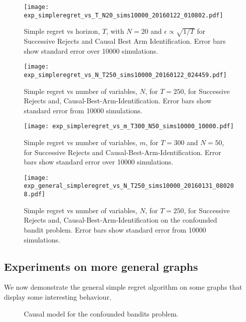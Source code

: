\begin{figure}
\caption{Simple regret vs horizon, $T$, with $N = 20$ and $\epsilon \propto \sqrt{1/T}$ for Successive Rejects and Causal Best Arm Identification. Error bars show standard error over 10000 simulations.}
\label{fig:simple_vs_T_vary_epsilon}
\centering
\texttt{[image: exp\_simpleregret\_vs\_T\_N20\_sims10000\_20160122\_010802.pdf]}
\end{figure}

\begin{figure}
\caption{Simple regret vs number of variables, $N$, for $T=250$, for Successive Rejects and, Causal-Best-Arm-Identification. Error bars show standard error from 10000 simulations.}
\label{fig:simple_vs_N}
\centering
\texttt{[image: exp\_simpleregret\_vs\_N\_T250\_sims10000\_20160122\_024459.pdf]}
\end{figure}


\begin{figure}
\caption{Simple regret vs number of variables, $m$, for $T=300$ and $N = 50$, for Successive Rejects and Causal-Best-Arm-Identification. Error bars show standard error over 10000 simulations.}
\label{fig:simple_vs_m}
\centering
\texttt{[image: exp\_simpleregret\_vs\_m\_T300\_N50\_sims10000\_10000.pdf]}
\end{figure}

\begin{figure}
\caption{Simple regret vs number of variables, $N$, for $T=250$, for Successive Rejects and, Causal-Best-Arm-Identification on the confounded bandit problem. Error bars show standard error from 10000 simulations.}
\label{fig:simple_vs_N_confounded}
\centering
\texttt{[image: exp\_general\_simpleregret\_vs\_N\_T250\_sims10000\_20160131\_080208.pdf]}
\end{figure}

\subsection{Experiments on more general graphs}
We now demonstrate the general simple regret algorithm on some graphs that display some interesting behaviour.
 
\begin{figure}[h]
\centering
\caption{Causal model for the confounded bandits problem.}
\label{fig:causalStructure_confounded_N}
\end{figure}

